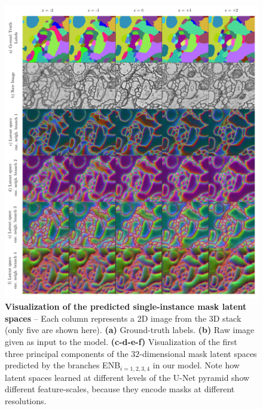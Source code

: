 \begin{figure}[t]
\centering
        \includegraphics[width=\textwidth]{./figures/LSIMasks/PCA_embeddings.pdf} %
        \vspace{1em}
        \caption{\textbf{Visualization of the predicted single-instance mask latent spaces} -- Each column represents a 2D image from the 3D stack (only five are shown here). \textbf{(a)} Ground-truth labels. \textbf{(b)} Raw image given as input to the model. \textbf{(c-d-e-f)} Visualization of the first three principal components of the $32$-dimensional mask latent spaces predicted by the \encBr branches ENB$_{i=1,2,3,4}$ in our model. Note how latent spaces learned at different levels of the U-Net pyramid show different feature-scales, because they encode \maskname masks at different resolutions.}
    \label{fig:PCA_embeddings}
\end{figure}

